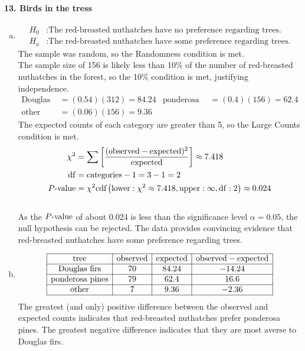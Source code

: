 \documentclass[../Homework]{subfiles}
\begin{document}
		\paragraph{13. Birds in the tress}
			\begin{enumerate}[a.]
				\item
					\begin{align*}
						H_0&: \text{The red-breasted nuthatches have no preference regarding trees.} \\
						H_a&: \text{The red-breasted nuthatches have some preference regarding trees.}
					\end{align*}
					The sample was random, so the Randomness condition is met. \\
					The sample size of 156 is likely less than 10\% of the number of red-breasted nuthatches in the forest, so the 10\% condition is met, justifying independence. \\
					\begin{align*}
						\text{Douglas firs} &= (0.54)(312) = 84.24 & \text{ponderosa pines} &= (0.4)(156) = 62.4 \\
						\text{other} &= (0.06)(156) = 9.36
					\end{align*}
					The expected counts of each category are greater than 5, so the Large Counts condition is met. \\
					\begin{align*}
						\chi^2 &= \sum\left[\mathrm{\frac{(observed - expected)^2}{expected}}\right] \approx 7.418 \\
						\operatorname{df} &= \text{categories} - 1 = 3 - 1 = 2 \\
						P\text{-value} &= \chi^2\text{cdf}\left(\operatorname{lower}: \chi^2 \approx 7.418, \operatorname{upper}: \infty, \operatorname{df}: 2\right) \approx 0.024 
					\end{align*} \\
					As the $P\text{-value}$ of about 0.024 is less than the significance level $\alpha = 0.05$, the null hypothesis can be rejected. The data provides convincing evidence that red-breasted nuthatches have some preference regarding trees.
				\item
					\[\begin{array}{|c|c|c|c|}\hline
						\text{tree} & \text{observed} & \text{expected} & \mathrm{observed - expected} \\\hline
						\text{Douglas firs} & 70 & 84.24 & -14.24 \\\hline
						\text{ponderosa pines} & 79 & 62.4  & 16.6 \\\hline
						\text{other} & 7 & 9.36 & -2.36 \\\hline
					\end{array}\]
					The greatest (and only) positive difference between the observed and expected counts indicates that red-breasted nuthatches prefer ponderosa pines. The greatest negative difference indicates that they are most averse to Douglas firs.
			\end{enumerate}
\end{document}
